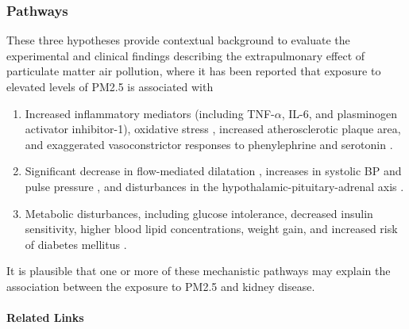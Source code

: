 \documentclass{article}
\begin{document}
\subsubsection{Pathways}

 These three hypotheses provide contextual background to evaluate the experimental and clinical findings describing the extrapulmonary effect of particulate matter air pollution, where it has been reported that exposure to elevated levels of PM2.5 is associated with \citep{bowe2018particulate}
 \begin{enumerate}
     \item Increased inflammatory mediators (including TNF-$\alpha$, IL-6, and plasminogen activator inhibitor-1), oxidative stress \citep{ostro2014chronic, ruckerl2014associations, sorensen2003personal}, increased atherosclerotic plaque area, and exaggerated vasoconstrictor responses to phenylephrine and serotonin \citep{sun2005long}.
     \item Significant decrease in flow-mediated dilatation \citep{krishnan2012vascular, wilker2014relation}, increases in systolic BP and pulse pressure \citep{auchincloss2008associations, fuks2014arterial, fuks2011long}, and disturbances in the hypothalamic-pituitary-adrenal axis \citep{thomson2013mapping}.
     \item  Metabolic disturbances, including glucose intolerance, decreased insulin sensitivity, higher blood lipid concentrations, weight gain, and increased risk of diabetes mellitus \citep{wei2016chronic, chen2016ambient, wolf2016association}.
 \end{enumerate}
 
It is plausible that one or more of these mechanistic pathways may explain the association between the exposure to PM2.5 and kidney disease.

\paragraph{Related Links}
\end{document}
